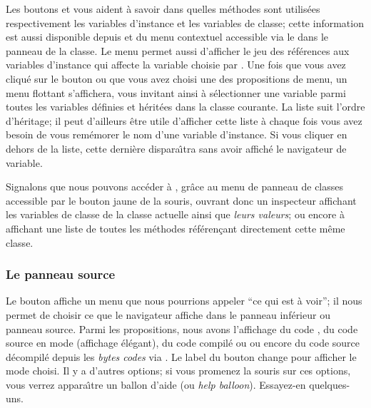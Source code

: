 \documentclass[a4paper,10pt,twoside]{book}
\begin{document}
Les boutons  et  vous aident \`a savoir
dans quelles m\'ethodes sont utilis\'ees respectivement les variables d'instance
et les variables de classe; cette information est aussi disponible depuis 
 et  du menu contextuel accessible via le 
 dans le panneau de la classe.
Le menu permet aussi d'afficher le jeu 
des r\'ef\'erences aux variables d'instance qui affecte la variable choisie
par .
Une fois que vous avez cliqu\'e sur le bouton ou que vous avez choisi une
des propositions de menu, un menu flottant s'affichera, vous invitant ainsi
\`a s\'electionner une variable parmi toutes les variables d\'efinies et
h\'erit\'ees dans la classe courante.
La liste suit l'ordre d'h\'eritage; il peut d'ailleurs \^etre utile d'afficher
cette liste \`a chaque fois vous avez besoin de vous rem\'emorer le nom d'une
variable d'instance. Si vous cliquer en dehors de la liste, cette derni\`ere
dispara\^{\i}tra sans avoir affich\'e le navigateur de variable.

Signalons que nous pouvons acc\'eder \`a ,
gr\^ace au menu de panneau de classes accessible par le bouton jaune
de la souris, 
ouvrant donc un inspecteur affichant les variables de classe 
de la classe actuelle ainsi que \emph{leurs valeurs};
ou encore \`a
 affichant une liste de toutes les m\'ethodes
r\'ef\'eren\c{c}ant directement cette m\^eme classe.

\subsubsection{Le panneau source}
\label{sec:sources}

Le bouton  affiche un menu que nous pourrions appeler
``ce qui est \`a voir''; il nous permet de choisir ce que le navigateur
affiche dans le panneau inf\'erieur ou panneau source.
Parmi les propositions, nous avons l'affichage du code , 
du code source en mode  (affichage \'el\'egant), 
du code compil\'e ou  ou encore du code source
d\'ecompil\'e depuis les \emph{bytes codes} via .
Le label du bouton change pour afficher le mode choisi. Il y a d'autres
options; si vous promenez la souris sur ces options, vous verrez
appara\^{\i}tre un ballon d'aide (ou \emph{help balloon}). Essayez-en
quelques-uns. 
\end{document}
